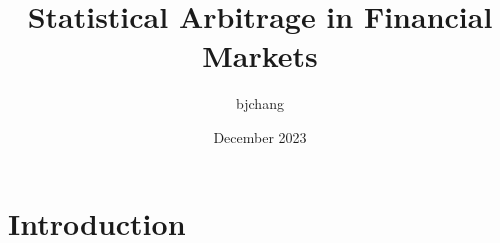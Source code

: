 \documentclass{article}
\title{Statistical Arbitrage in Financial Markets}
\author{bjchang }
\date{December 2023}
\begin{document}
\maketitle

\section{Introduction}
\end{document}

